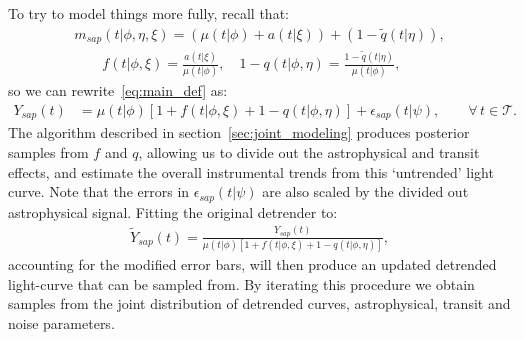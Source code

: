 \documentclass[a4paper,11pt]{article}
\begin{document}
To try to model things more fully, recall that:
\begin{gather*}
m_{sap}(t|\phi,\eta,\xi) = (\mu(t|\phi)+a(t|\xi)) + (1 - \tilde{q}(t|\eta)) , \\
\qquad f(t|\phi,\xi) = \frac{a(t|\xi)}{\mu(t|\phi)} , \quad 1-q(t|\phi,\eta) = \frac{1-\tilde{q}(t|\eta)}{\mu(t|\phi)} ,
\end{gather*}
so we can rewrite~\eqref{eq:main_def} as:
\begin{align}
\label{eq:main_def}
 Y_{sap}(t) &= \mu(t|\phi)\left[1 + f(t|\phi,\xi) + 1- q(t|\phi,\eta)\right] + \epsilon_{sap}(t|\psi) , \qquad \forall \, t \in \mathcal{T} .
\end{align}
The algorithm described in section~\ref{sec:joint_modeling} produces posterior samples from $f$ and $q$, allowing us to divide out the astrophysical and transit effects, and estimate the overall instrumental trends from this \lq{}untrended\rq{} light curve. Note that the errors in $\epsilon_{sap}(t|\psi)$ are also scaled by the divided out astrophysical signal. Fitting the original detrender to: 
\begin{align}
\label{eq:alt_main_def}
\tilde{Y}_{sap}(t) = \frac{Y_{sap}(t)}{\mu(t|\phi)\left[1 + f(t|\phi,\xi) + 1- q(t|\phi,\eta)\right]} ,
\end{align}
accounting for the modified error bars, will then produce an updated detrended light-curve that can be sampled from. By iterating this procedure we obtain samples from the joint distribution of detrended curves, astrophysical, transit and noise parameters.
\end{document}
